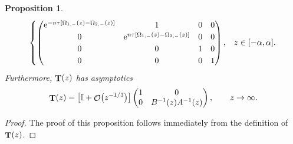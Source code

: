 \documentclass[pdftex]{sigma}
\DeclareMathOperator{\OO}{\mathcal{O}}
\DeclareMathOperator{\TT}{{\bf T}}
\numberwithin{equation}{section}
\newtheorem{Proposition}[Theorem]{Proposition}
 { \theoremstyle{definition}
\newtheorem{Definition}[Theorem]{Definition}
\newtheorem{Note}[Theorem]{Note}
\newtheorem{Example}[Theorem]{Example}
\newtheorem{Remark}[Theorem]{Remark} }
\begin{document}
\begin{Proposition}
\begin{equation*}
\begin{cases}
 \begin{pmatrix}
 {\rm e}^{-n\tau[\Omega_{1,-}(z)-\Omega_{2,-}(z)]} & 1 & 0 & 0 \\
 0 & {\rm e}^{n\tau[\Omega_{1,-}(z)-\Omega_{2,-}(z)]} & 0 & 0\\
 0 & 0 & 1 & 0 \\
 0 & 0 & 0 & 1
 \end{pmatrix},
 & z\in [-\alpha,\alpha].
 \end{cases}
 \end{equation*}
 Furthermore, $\TT(z)$ has asymptotics
\begin{equation*}%
 \TT(z) =
 \bigl[\mathbb{I} + \OO \bigl(z^{-1/3}\bigr)\bigr]
 \begin{pmatrix}
 1 & 0\\
 0 & B^{-1}(z) A^{-1}(z)
 \end{pmatrix}, \qquad z\to \infty.
\end{equation*}
 \end{Proposition}
\begin{proof}
 The proof of this proposition follows immediately from the definition of $\TT(z)$.
\end{proof}
\end{document}
